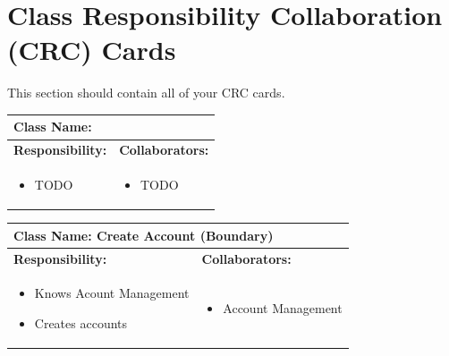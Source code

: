 \documentclass[]{article}
\begin{document}
\section{Class Responsibility Collaboration (CRC) Cards}
\label{sec:class_responsibility_collaboration_crc_cards}
This section should contain all of your CRC cards.

\begin{table}[H]
	\centering
	\begin{tabular}{|p{7cm}|p{7cm}|}
	\hline 
	 \multicolumn{2}{|l|}{\textbf{Class Name:}} \\
	\hline
	\textbf{Responsibility:} & \textbf{Collaborators:} \\
	\hline
	\raggedright
	\begin{itemize}
		\item TODO
	\end{itemize}
	\vspace{1in} & 
	\begin{itemize}
		\item TODO
	\end{itemize} \\
	\hline
	\end{tabular}
\end{table}

\begin{table}[H]
	\centering
	\begin{tabular}{|p{7cm}|p{7cm}|}
	\hline 
	 \multicolumn{2}{|l|}{\textbf{Class Name:} Create Account (Boundary)} \\
	\hline
	\textbf{Responsibility:} & \textbf{Collaborators:} \\
	\hline
	\raggedright
	\begin{itemize}
		\item Knows Acount Management
		\item Creates accounts
	\end{itemize}
	\vspace{1in} & 
	\begin{itemize}
		\item Account Management
	\end{itemize} \\
	\hline
	\end{tabular}
\end{table}
\end{document}
